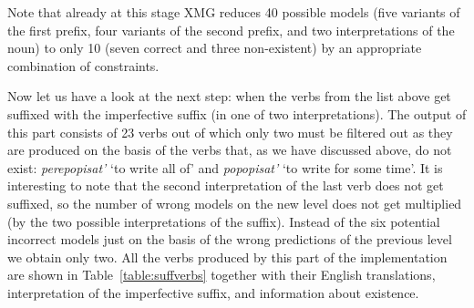 Note that already at this stage XMG reduces 40 possible models (five variants of the first prefix, four variants of the second prefix, and two interpretations of the noun) to only 10 (seven correct and three non-existent) by an appropriate combination of constraints. 

Now let us have a look at the next step: when the verbs from the list above get suffixed with the imperfective suffix (in one of two interpretations). The output of this part consists of 23 verbs out of which only two must be filtered out as they are produced on the basis of the verbs that, as we have discussed above, do not exist: \textit{perepopisat'} `to write all of' and \textit{popopisat'} `to write for some time'. It is interesting to note that the second interpretation of the last verb does not get suffixed, so the number of wrong models on the new level does not get multiplied (by the two possible interpretations of the suffix). Instead of the six potential incorrect models just on the basis of the wrong predictions of the previous level we obtain only two. All the verbs produced by this part of the implementation are shown in Table~\ref{table:suffverbs} together with their English translations, interpretation of the imperfective suffix, and information about existence.

